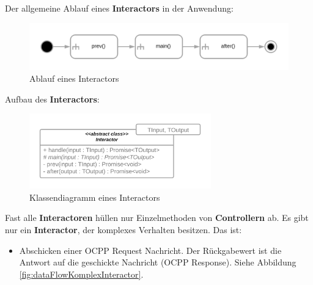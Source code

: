 Der allgemeine Ablauf eines \textbf{Interactors} in der Anwendung:
\begin{figure}[H]
    \centering
    \includegraphics[width=1\textwidth]{./images/InteractorAblauf.png}
    \caption[Ablauf eines Interactors]{Ablauf eines Interactors}
    \label{fig:InteractorFlow}
\end{figure}
Aufbau des \textbf{Interactors}:
\begin{figure}[H]
    \centering
    \includegraphics[width=0.7\textwidth]{./images/InteractorStructur.png}
    \caption[Klassendiagramm eines Interactors]{Klassendiagramm eines Interactors}
    \label{fig:InteractorStructur}
\end{figure}


Fast alle \textbf{Interactoren} hüllen nur Einzelmethoden von \textbf{Controllern} ab.
Es gibt nur ein \textbf{Interactor}, der komplexes Verhalten besitzen.
Das ist:
\begin{itemize}
    \item Abschicken einer OCPP Request Nachricht. Der Rückgabewert ist die Antwort auf die geschickte Nachricht (OCPP Response).
    Siehe Abbildung \ref{fig:dataFlowKomplexInteractor}.
\end{itemize}